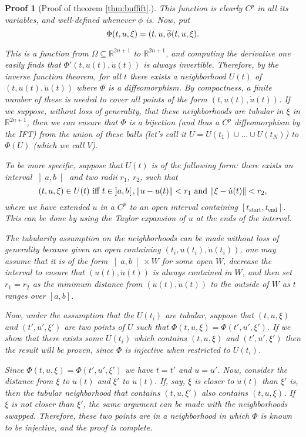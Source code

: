 \documentclass{article}
\theoremstyle{plain}
\theoremstyle{plain}
\theoremstyle{nonumberplain}
\theoremstyle{empty}
\newtheorem{proofref}{Proof}
\newcommand{\R}{\mathbb{R}}
\newcommand{\tstart}{\mathrm{start}}
\newcommand{\tend}{\mathrm{end}}
\newcommand{\wtphi}{
  \mspace{2mu}
  \widetilde{\mspace{-2mu}\smash[t]{\phi}}
}
\DeclarePairedDelimiter\norm{\lVert}{\rVert}
\begin{document}
\begin{appendices}
\begin{proofref}[Proof of theorem \ref{thm:buffift}.]
This function is clearly $C^p$ in all its variables, and well-defined whenever $\phi$ is. Now, put
\[\Phi(t,u,\xi) = (t, u, \wtphi(t,u,\xi).\]

This is a function from $\Omega \subseteq \R^{2n + 1}$ to $\R^{2n+1}$, and computing the derivative one easily finds that $\Phi'(t,u(t),\dot u(t))$ is always invertible. Therefore, by the inverse function theorem, for all $t$ there exists a neighborhood $U(t)$ of $(t,u(t), \dot u(t))$ where $\Phi$ is a diffeomorphism. By compactness, a finite number of these is needed to cover all points of the form $(t,u(t), \dot u(t))$. If we suppose, without loss of generality, that these neighborhoods are tubular in $\xi$ in $\R^{2n+1}$, then we can ensure that $\Phi$ is a bijection (and thus a $C^p$ diffeomorphism by the IFT) from the union of these balls (let's call it $U = U(t_1) \cup \dots \cup U(t_N)$) to $\Phi(U)$ (which we call $V$).

To be more specific, suppose that $U(t)$ is of the following form: there exists an interval $\left]a,b\right[$ and two radii $r_1$, $r_2$, such that
\[(t,u,\xi) \in U(t) \text{ iff } t \in \left]a,b\right[, \norm{u-u(t)} < r_1 \text{ and } \norm{\xi - \dot u(t)} < r_2,\]
where we have extended $u$ in a $C^p$ to an open interval containing $[t_\tstart, t_\tend]$. This can be done by using the Taylor expansion of $u$ at the ends of the interval.

The tubularity assumption on the neighborhoods can be made without loss of generality because given an open containing $(t_i, u(t_i), \dot u(t_i))$, one may assume that it is of the form $\left]a,b\right[ \times W$ for some open $W$, decrease the interval to ensure that $(u(t),\dot u(t))$ is always contained in $W$, and then set $r_1 = r_2$ as the minimum distance from $(u(t), \dot u(t))$ to the outside of $W$ as $t$ ranges over $[a,b]$.

Now, under the assumption that the $U(t_i)$ are tubular, suppose that $(t,u,\xi)$ and $(t', u', \xi')$ are two points of $U$ such that $\Phi(t,u,\xi) = \Phi(t', u', \xi')$. If we show that there exists some $U(t_i)$ which contains $(t,u,\xi)$ and $(t',u',\xi')$ then the result will be proven, since $\Phi$ is injective when restricted to $U(t_i)$.

Since $\Phi(t,u,\xi) = \Phi(t', u', \xi')$ we have $t = t'$ and $u = u'$. Now, consider the distance from $\xi$ to $\dot u(t)$ and $\xi'$ to $\dot u(t)$. If, say, $\xi$ is closer to $\dot u(t)$ than $\xi'$ is, then the tubular neighborhood that contains $(t,u,\xi')$ also contains $(t,u,\xi)$. If $\xi$ is not closer than $\xi'$, the same argument can be made with the neighborhoods swapped. Therefore, these two points are in a neighborhood in which $\Phi$ is known to be injective, and the proof is complete.
\end{proofref}

\end{appendices}



\end{document}
